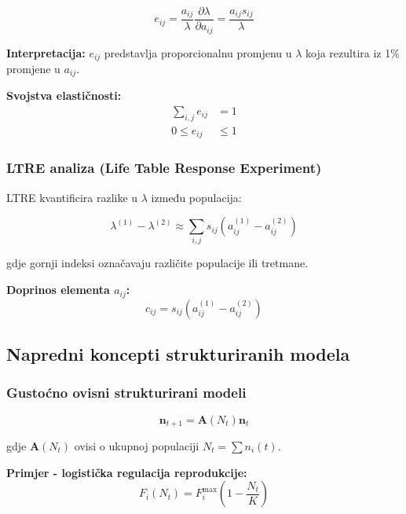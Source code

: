 \documentclass[11pt,oneside]{book}
\begin{document}
\begin{equation}
	e_{ij} = \frac{a_{ij}}{\lambda} \frac{\partial \lambda}{\partial a_{ij}} = \frac{a_{ij} s_{ij}}{\lambda}
\end{equation}

\textbf{Interpretacija:}
$e_{ij}$ predstavlja proporcionalnu promjenu u $\lambda$ koja rezultira iz 1\% promjene u $a_{ij}$.

\textbf{Svojstva elastičnosti:}
\begin{align}
	\sum_{i,j} e_{ij} &= 1 \\
	0 \leq e_{ij} &\leq 1
\end{align}

\subsubsection{LTRE analiza (Life Table Response Experiment)}

LTRE kvantificira razlike u $\lambda$ između populacija:

\begin{equation}
	\lambda^{(1)} - \lambda^{(2)} \approx \sum_{i,j} s_{ij} (a_{ij}^{(1)} - a_{ij}^{(2)})
\end{equation}

gdje gornji indeksi označavaju različite populacije ili tretmane.

\textbf{Doprinos elementa $a_{ij}$:}
\begin{equation}
	c_{ij} = s_{ij} (a_{ij}^{(1)} - a_{ij}^{(2)})
\end{equation}

\subsection{Napredni koncepti strukturiranih modela}

\subsubsection{Gustoćno ovisni strukturirani modeli}

\begin{equation}
	\mathbf{n}_{t+1} = \mathbf{A}(N_t) \mathbf{n}_t
\end{equation}

gdje $\mathbf{A}(N_t)$ ovisi o ukupnoj populaciji $N_t = \sum n_i(t)$.

\textbf{Primjer - logistička regulacija reprodukcije:}
\begin{equation}
	F_i(N_t) = F_i^{\max} \left(1 - \frac{N_t}{K}\right)
\end{equation}
\end{document}
